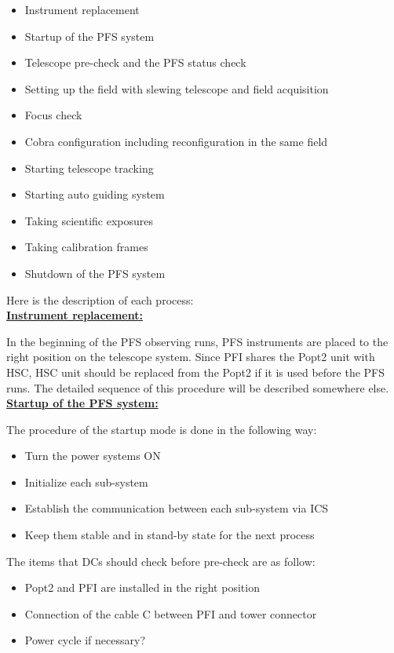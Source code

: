 \documentclass[a4paper]{article}
\begin{document}
\begin{itemize}
\item Instrument replacement
\item Startup of the PFS system
\item Telescope pre-check and the PFS status check
\item Setting up the field with slewing telescope and field acquisition
\item Focus check
\item Cobra configuration including reconfiguration in the same field
\item Starting telescope tracking
\item Starting auto guiding system
\item Taking scientific exposures
\item Taking calibration frames
\item Shutdown of the PFS system
\end{itemize}

\noindent Here is the description of each process:\\

\noindent \underline{\textbf{Instrument replacement:}}
\vspace{5pt}

In the beginning of the PFS observing runs, PFS instruments are placed to the right position on the telescope system. Since PFI shares the Popt2 unit with HSC, HSC unit should be replaced from the Popt2 if it is used before the PFS runs. The detailed sequence of this procedure will be described somewhere else.\\

\noindent \underline{\textbf{Startup of the PFS system:}}
\vspace{5pt}

The procedure of the startup mode is done in the following way:

\begin{itemize}
\item Turn the power systems ON
\item Initialize each sub-system
\item Establish the communication between each sub-system via ICS
\item Keep them stable and in stand-by state for the next process
\end{itemize}

The items that DCs should check before pre-check are as follow:
\begin{itemize}
\item Popt2 and PFI are installed in the right position
\item Connection of the cable C between PFI and tower connector
\item Power cycle if necessary?
\end{itemize}
\end{document}
